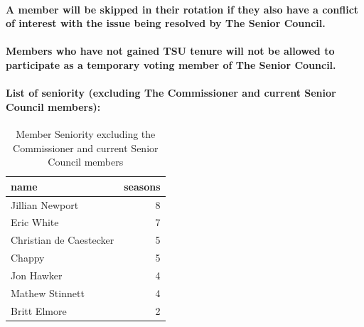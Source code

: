 \documentclass[]{book}
\let\oldparagraph\paragraph
\renewcommand{\paragraph}[1]{\oldparagraph{#1}\mbox{}}
\begin{document}
\hypertarget{a-member-will-be-skipped-in-their-rotation-if-they-also-have-a-conflict-of-interest-with-the-issue-being-resolved-by-the-senior-council.}{%
\paragraph{A member will be skipped in their rotation if they also have a conflict of interest with the issue being resolved by The Senior Council.}\label{a-member-will-be-skipped-in-their-rotation-if-they-also-have-a-conflict-of-interest-with-the-issue-being-resolved-by-the-senior-council.}}

\hypertarget{members-who-have-not-gained-tsu-tenure-will-not-be-allowed-to-participate-as-a-temporary-voting-member-of-the-senior-council.}{%
\paragraph{Members who have not gained TSU tenure will not be allowed to participate as a temporary voting member of The Senior Council.}\label{members-who-have-not-gained-tsu-tenure-will-not-be-allowed-to-participate-as-a-temporary-voting-member-of-the-senior-council.}}

\hypertarget{list-of-seniority-excluding-the-commissioner-and-current-senior-council-members}{%
\paragraph{List of seniority (excluding The Commissioner and current Senior Council members):}\label{list-of-seniority-excluding-the-commissioner-and-current-senior-council-members}}

\begin{table}[t]

\caption{\label{tab:unnamed-chunk-4}Member Seniority excluding the Commissioner and current Senior Council members}
\centering
\begin{tabular}{lr}
\toprule
name & seasons\\
\midrule
Jillian Newport & 8\\
Eric White & 7\\
Christian de Caestecker & 5\\
Chappy & 5\\
Jon Hawker & 4\\
\addlinespace
Mathew Stinnett & 4\\
Britt Elmore & 2\\
\bottomrule
\end{tabular}
\end{table}
\end{document}
